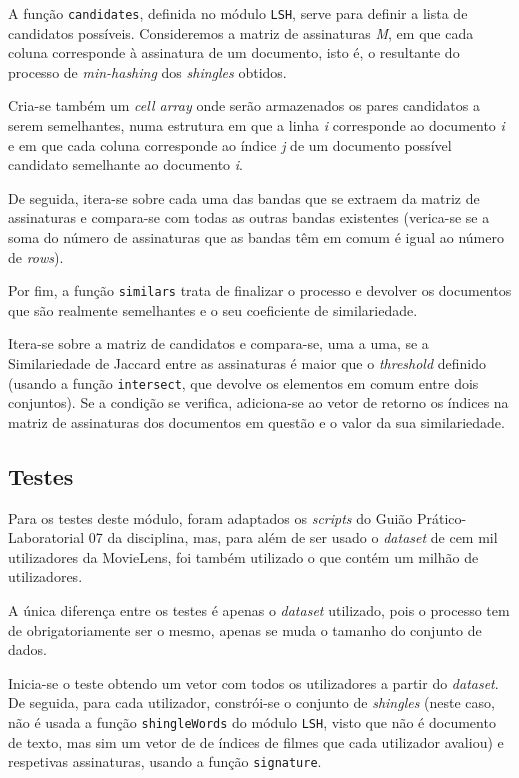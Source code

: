 \documentclass[a4paper,11pt,openright,oneside]{report}
\begin{document}
A função \texttt{candidates}, definida no módulo \texttt{LSH}, serve para definir a lista de candidatos possíveis. Consideremos a matriz de assinaturas \textit{M}, em que cada coluna corresponde à assinatura de um documento, isto é, o resultante do processo de \textit{min-hashing} dos \textit{shingles} obtidos.


Cria-se também um \textit{cell array} onde serão armazenados os pares candidatos a serem semelhantes, numa estrutura em que a linha \textit{i} corresponde ao documento \textit{i} e em que cada coluna corresponde ao índice \textit{j} de um documento possível candidato semelhante ao documento \textit{i}.

De seguida, itera-se sobre cada uma das bandas que se extraem da matriz de assinaturas e compara-se com todas as outras bandas existentes (verica-se se a soma do número de assinaturas que as bandas têm em comum é igual ao número de \textit{rows}).

Por fim, a função \texttt{similars} trata de finalizar o processo e devolver os documentos que são realmente semelhantes e o seu coeficiente de similariedade.

Itera-se sobre a matriz de candidatos e compara-se, uma a uma, se a Similariedade de Jaccard entre as assinaturas é maior que o \textit{threshold} definido (usando a função \texttt{intersect}, que devolve os elementos em comum entre dois conjuntos). Se a condição se verifica, adiciona-se ao vetor de retorno os índices na matriz de assinaturas dos documentos em questão e o valor da sua similariedade.

\subsection{Testes}
\label{subsec.lshtests}
Para os testes deste módulo, foram adaptados os \textit{scripts} do Guião Prático-Laboratorial 07 da disciplina, mas, para além de ser usado o \textit{dataset} de cem mil utilizadores da MovieLens, foi também utilizado o que contém um milhão de utilizadores.

A única diferença entre os testes é apenas o \textit{dataset} utilizado, pois o processo tem de obrigatoriamente ser o mesmo, apenas se muda o tamanho do conjunto de dados.

Inicia-se o teste obtendo um vetor com todos os utilizadores a partir do \textit{dataset}. De seguida, para cada utilizador, constrói-se o conjunto de \textit{shingles} (neste caso, não é usada a função \texttt{shingleWords} do módulo \texttt{LSH}, visto que não é documento de texto, mas sim um vetor de de índices de filmes que cada utilizador avaliou) e respetivas assinaturas, usando a função \texttt{signature}. 
\end{document}
